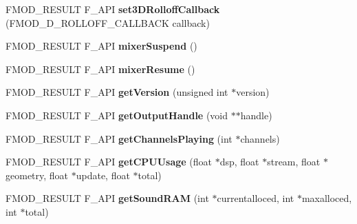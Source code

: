 \begin{DoxyCompactItemize}
\item 
\hypertarget{class_f_m_o_d_1_1_system_a4c1e8040d33a4a1852a31a2ec2e64aa7}{F\+M\+O\+D\+\_\+\+R\+E\+S\+U\+L\+T F\+\_\+\+A\+P\+I {\bfseries set3\+D\+Rolloff\+Callback} (F\+M\+O\+D\+\_\+D\+\_\+\+R\+O\+L\+L\+O\+F\+F\+\_\+\+C\+A\+L\+L\+B\+A\+C\+K callback)}\label{class_f_m_o_d_1_1_system_a4c1e8040d33a4a1852a31a2ec2e64aa7}

\item 
\hypertarget{class_f_m_o_d_1_1_system_a6e53642e611a3d789821576dc95a2e20}{F\+M\+O\+D\+\_\+\+R\+E\+S\+U\+L\+T F\+\_\+\+A\+P\+I {\bfseries mixer\+Suspend} ()}\label{class_f_m_o_d_1_1_system_a6e53642e611a3d789821576dc95a2e20}

\item 
\hypertarget{class_f_m_o_d_1_1_system_af95cc86f56519233a4b2a8048ce92ef7}{F\+M\+O\+D\+\_\+\+R\+E\+S\+U\+L\+T F\+\_\+\+A\+P\+I {\bfseries mixer\+Resume} ()}\label{class_f_m_o_d_1_1_system_af95cc86f56519233a4b2a8048ce92ef7}

\item 
\hypertarget{class_f_m_o_d_1_1_system_ac248a1234309ccb8be4c69f6b1a8d07e}{F\+M\+O\+D\+\_\+\+R\+E\+S\+U\+L\+T F\+\_\+\+A\+P\+I {\bfseries get\+Version} (unsigned int $\ast$version)}\label{class_f_m_o_d_1_1_system_ac248a1234309ccb8be4c69f6b1a8d07e}

\item 
\hypertarget{class_f_m_o_d_1_1_system_a0bd90d8ae95bad9f2cca9658b73da96d}{F\+M\+O\+D\+\_\+\+R\+E\+S\+U\+L\+T F\+\_\+\+A\+P\+I {\bfseries get\+Output\+Handle} (void $\ast$$\ast$handle)}\label{class_f_m_o_d_1_1_system_a0bd90d8ae95bad9f2cca9658b73da96d}

\item 
\hypertarget{class_f_m_o_d_1_1_system_a5188b4b34e150daf4cc64dde24ad1c1c}{F\+M\+O\+D\+\_\+\+R\+E\+S\+U\+L\+T F\+\_\+\+A\+P\+I {\bfseries get\+Channels\+Playing} (int $\ast$channels)}\label{class_f_m_o_d_1_1_system_a5188b4b34e150daf4cc64dde24ad1c1c}

\item 
\hypertarget{class_f_m_o_d_1_1_system_a3faa4a44c39af4c49f5812bb000c43d4}{F\+M\+O\+D\+\_\+\+R\+E\+S\+U\+L\+T F\+\_\+\+A\+P\+I {\bfseries get\+C\+P\+U\+Usage} (float $\ast$dsp, float $\ast$stream, float $\ast$geometry, float $\ast$update, float $\ast$total)}\label{class_f_m_o_d_1_1_system_a3faa4a44c39af4c49f5812bb000c43d4}

\item 
\hypertarget{class_f_m_o_d_1_1_system_a406c76a44c183773616569d2cdec2036}{F\+M\+O\+D\+\_\+\+R\+E\+S\+U\+L\+T F\+\_\+\+A\+P\+I {\bfseries get\+Sound\+R\+A\+M} (int $\ast$currentalloced, int $\ast$maxalloced, int $\ast$total)}\label{class_f_m_o_d_1_1_system_a406c76a44c183773616569d2cdec2036}


\end{DoxyCompactItemize}
